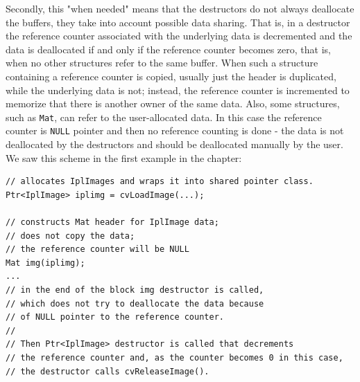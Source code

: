 Secondly, this "when needed" means that the destructors do not always deallocate the buffers, they take into account possible data sharing.
That is, in a destructor the reference counter associated with the underlying data is decremented and the data is deallocated
if and only if the reference counter becomes zero, that is, when no other structures refer to the same buffer. When such a structure
containing a reference counter is copied, usually just the header is duplicated, while the underlying data is not; instead, the reference counter is incremented to memorize that there is another owner of the same data.
Also, some structures, such as \texttt{Mat}, can refer to the user-allocated data.
In this case the reference counter is \texttt{NULL} pointer and then no reference counting is done - the data is not deallocated by the destructors and should be deallocated manually by the user. We saw this scheme in the first example in the chapter:
\begin{lstlisting}
// allocates IplImages and wraps it into shared pointer class.
Ptr<IplImage> iplimg = cvLoadImage(...);

// constructs Mat header for IplImage data;
// does not copy the data;
// the reference counter will be NULL
Mat img(iplimg);
...
// in the end of the block img destructor is called,
// which does not try to deallocate the data because
// of NULL pointer to the reference counter.
//
// Then Ptr<IplImage> destructor is called that decrements
// the reference counter and, as the counter becomes 0 in this case,
// the destructor calls cvReleaseImage().
\end{lstlisting}

